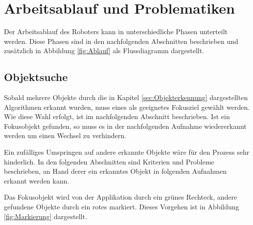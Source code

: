 \chapter{Arbeitsablauf und Problematiken}
\label{cha:Workloop}

Der Arbeitsablauf des Roboters kann in unterschiedliche Phasen unterteilt werden. Diese Phasen sind in den nachfolgenden Abschnitten beschrieben und zusätzlich in Abbildung \ref{fig:Ablauf} als Flussdiagramm dargestellt.

\section{Objektsuche}

Sobald mehrere Objekte durch die in Kapitel \ref{sec:Objekterkennung} dargestellten Algorithmen erkannt wurden, muss eines als geeignetes Fokusziel gewählt werden. Wie diese Wahl erfolgt, ist im nachfolgenden Abschnitt beschrieben. Ist ein Fokusobjekt gefunden, so muss es in der nachfolgenden Aufnahme wiedererkannt werden um einen Wechsel zu verhindern. 

Ein zufälliges Umspringen auf andere erkannte Objekte wäre für den Prozess sehr hinderlich. In den folgenden Abschnitten sind Kriterien und Probleme beschrieben, an Hand derer ein erkanntes Objekt in folgenden Aufnahmen erkannt werden kann.

Das Fokusobjekt wird von der Applikation durch ein grünes Rechteck, andere gefundene Objekte durch ein rotes markiert. Dieses Vorgehen ist in Abbildung \ref{fig:Markierung} dargestellt.

\pagebreak

